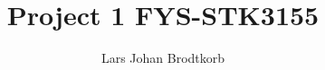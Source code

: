 \documentclass[10pt,a4paper]{article}
\begin{document}
\title{Project 1 FYS-STK3155}
\author{Lars Johan Brodtkorb}
\maketitle


\tableofcontents
\newpage






%
%
%
\end{document}
